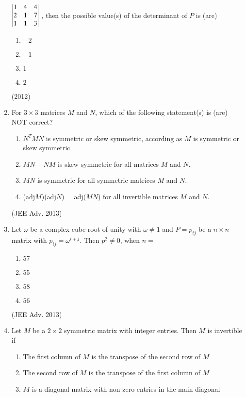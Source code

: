 \documentclass[journal,12pt,twocolumn]{IEEEtran}
\theoremstyle{remark}
\begin{document}
\begin{enumerate}
							$\begin{vmatrix}	
								1&4&4\\
								2&1&7\\
								1&1&3
							\end{vmatrix}$
					, then the possible value(s) of the determinant of $P$ is (are)
						\begin{enumerate}
							\item $-2$
							\item $-1$
							\item $1$
							\item $2$
						\end{enumerate}
						\hfill (2012)\\
				\item 
					For $3 \times 3$ matrices $M$ and $N$, which of the following statement(s) is (are) NOT correct?
						\begin{enumerate}
							\item $N^TMN$ is symmetric or skew symmetric, according as $M$ is symmetric or skew symmetric
							\item $MN-NM$ is skew symmetric for all matrices $M$ and $N$.
							\item $MN$ is symmetric for all symmetric matrices $M$ and $N$.
							\item (adj$M$)(adj$N$) = adj($MN$) for all invertible matrices $M$ and $N$.
						\end{enumerate}
						\hfill (JEE Adv. 2013)\\
				\item 
					Let $\omega$ be a complex cube root of unity with $\omega \neq 1 $ and $P={p_{ij}}$ be a $n \times n$ matrix with $p_{ij} = \omega^{i+j}$. Then $p^2 \neq 0$, when $n=$
					\begin{enumerate}
						\item $57$
						\item $55$
						\item $58$
						\item $56$
					\end{enumerate}
					\hfill (JEE Adv. 2013)\\
				\item 
					Let $M$ be a $2 \times 2$ symmetric matrix with integer entries. Then $M$ is invertible if
						\begin{enumerate}
							\item The first column of $M$ is the transpose of the second row of $M$
							\item The second row of $M$ is the transpose of the first column of $M$
							\item $M$ is a diagonal matrix with non-zero entries in the main diagonal

\end{enumerate}
\end{enumerate}
\end{document}
